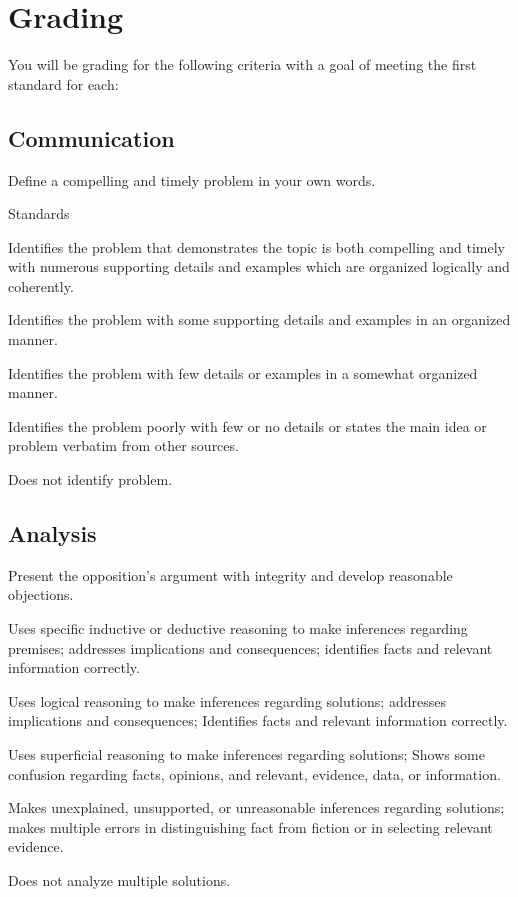 \documentclass{tufte-handout}\usepackage[]{graphicx}\usepackage[]{color}
\newenvironment{enumerate*}%
  {\begin{enumerate}%
    \setlength{\itemsep}{0pt}%
    \setlength{\parskip}{0pt}}%
  {\end{enumerate}}
\begin{document}
\section{Grading}

You will be grading for the following criteria with a goal of meeting the first standard for each:

\subsection{Communication}

Define a compelling and timely problem in your own words. 

Standards

\begin{enumerate*}
	\item Identifies the problem that demonstrates the topic is both compelling and timely with numerous supporting details and examples which are organized logically and coherently.		
	\item Identifies the problem with some supporting details and examples in an organized manner.	
	\item Identifies the problem with few details or examples in a somewhat organized manner.	
	\item Identifies the problem poorly with few or no details or states the main idea or problem verbatim from other sources.
	\item Does not identify problem.
\end{enumerate*}

\subsection{Analysis}

Present the opposition's argument with integrity and develop reasonable objections.

\begin{enumerate*}
	\item Uses specific inductive or deductive reasoning to make inferences regarding premises; addresses implications and consequences; identifies facts and relevant information correctly.	
	\item Uses logical reasoning to make inferences regarding solutions; addresses implications and consequences; Identifies facts and relevant information correctly.		
	\item Uses superficial reasoning to make inferences regarding solutions; Shows some confusion regarding facts, opinions, and relevant, evidence, data, or information.	
	\item Makes unexplained, unsupported, or unreasonable inferences regarding solutions; makes multiple errors in distinguishing fact from fiction or in selecting relevant evidence. 	
	\item Does not analyze multiple solutions.
\end{enumerate*}
\end{document}

